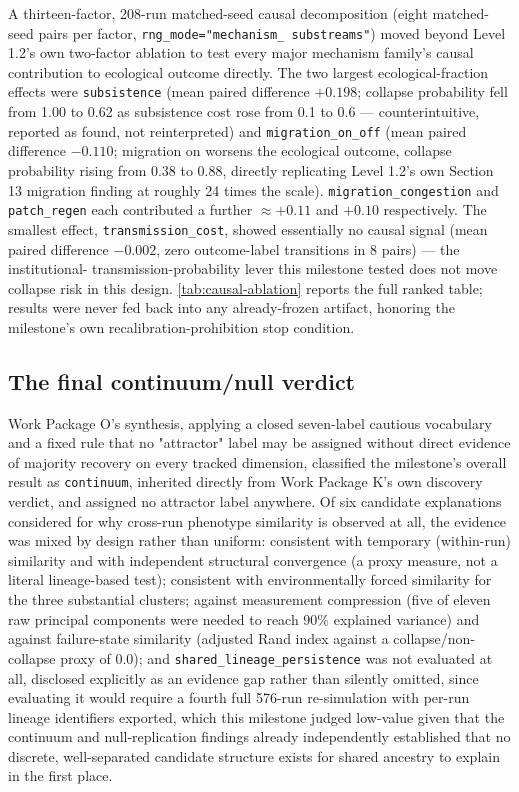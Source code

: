 A thirteen-factor, 208-run matched-seed causal decomposition (eight
matched-seed pairs per factor, \texttt{rng\_mode="mechanism\_%
substreams"}) moved beyond Level 1.2's own two-factor ablation to test
every major mechanism family's causal contribution to ecological outcome
directly. The two largest ecological-fraction effects were
\texttt{subsistence} (mean paired difference $+0.198$; collapse
probability fell from 1.00 to 0.62 as subsistence cost rose from 0.1 to
0.6 --- counterintuitive, reported as found, not reinterpreted) and
\texttt{migration\_on\_off} (mean paired difference $-0.110$; migration on
worsens the ecological outcome, collapse probability rising from 0.38 to
0.88, directly replicating Level 1.2's own Section 13 migration finding
at roughly 24 times the scale). \texttt{migration\_congestion} and
\texttt{patch\_regen} each contributed a further $\approx+0.11$ and
$+0.10$ respectively. The smallest effect, \texttt{transmission\_cost},
showed essentially no causal signal (mean paired difference $-0.002$,
zero outcome-label transitions in 8 pairs) --- the institutional-
transmission-probability lever this milestone tested does not move
collapse risk in this design. \cref{tab:causal-ablation} reports the full
ranked table; results were never fed back into any already-frozen
artifact, honoring the milestone's own recalibration-prohibition stop
condition.

\subsection{The final continuum/null verdict}
\label{sec:level12b-verdict}

Work Package O's synthesis, applying a closed seven-label cautious
vocabulary and a fixed rule that no "attractor" label may be assigned
without direct evidence of majority recovery on every tracked dimension,
classified the milestone's overall result as \texttt{continuum}, inherited
directly from Work Package K's own discovery verdict, and assigned no
attractor label anywhere. Of six candidate explanations considered for why
cross-run phenotype similarity is observed at all, the evidence was mixed
by design rather than uniform: consistent with temporary (within-run)
similarity and with independent structural convergence (a proxy measure,
not a literal lineage-based test); consistent with environmentally forced
similarity for the three substantial clusters; against measurement
compression (five of eleven raw principal components were needed to reach
90\% explained variance) and against failure-state similarity (adjusted
Rand index against a collapse/non-collapse proxy of 0.0); and
\texttt{shared\_lineage\_persistence} was not evaluated at all, disclosed
explicitly as an evidence gap rather than silently omitted, since
evaluating it would require a fourth full 576-run re-simulation with
per-run lineage identifiers exported, which this milestone judged
low-value given that the continuum and null-replication findings already
independently established that no discrete, well-separated candidate
structure exists for shared ancestry to explain in the first place.
